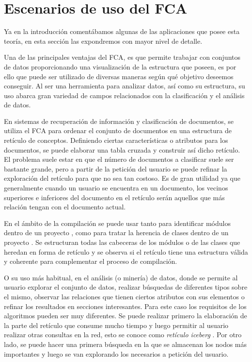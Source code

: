 \documentclass[oneside,openright,titlepage,numbers=noenddot,openany,headinclude,footinclude=true,
cleardoublepage=empty,abstractoff,BCOR=5mm,paper=a4,fontsize=12pt,main=spanish]{scrreprt}
\begin{document}
\section{Escenarios de uso del FCA}
 
Ya en la introducción comentábamos algunas de las aplicaciones que posee esta teoría, en esta sección las expondremos con mayor nivel de detalle. 

Una de las principales ventajas del FCA, es que permite trabajar con conjuntos de datos proporcionando una visualización de la estructura que poseen, es por ello que puede ser utilizado de diversas maneras según qué objetivo deseemos conseguir. Al ser una herramienta para analizar datos, así como su estructura, su uso abarca gran variedad de campos relacionados con la clasificación y el análisis de datos. 

En sistemas de recuperación de información y clasificación de documentos\cite{carpineto_lattice_1996}, \cite{lindig_concept-based_nodate} se utiliza el FCA para ordenar el conjunto de documentos en una estructura de retículo de conceptos. Definiendo ciertas características o atributos para los documentos, se puede elaborar una tabla cruzada y construir así dicho retículo. El problema suele estar en que el número de documentos a clasificar suele ser bastante grande, pero a partir de la petición del usuario se puede refinar la exploración del retículo para que no sea tan costoso. Es de gran utilidad ya que generalmente cuando un usuario se encuentra en un documento, los vecinos superiores e inferiores del documento en el retículo serán aquellos que más relación tengan con el documento actual.

En el ámbito de la compilación se puede usar tanto para identificar módulos dentro de un proyecto \cite{modules_fca}, como para tratar la herencia de clases dentro de un proyecto \cite{classhierarchies_fca}. Se estructuran todas las cabeceras de los módulos o de las clases que heredan en forma de retículo y se observa si el retículo tiene una estructura válida y coherente para complementar el proceso de compilación.

O su uso más habitual, en el análisis (o minería) de datos, donde se permite al usuario explorar el conjunto de datos, realizar búsquedas de diferentes tipos sobre el mismo, observar las relaciones que tienen ciertos atributos con sus elementos o refinar los resultados en secciones interesantes. Para este caso los requisitos de los algoritmos pueden ser muy diferentes. Se puede realizar primero la elaboración de la parte del retículo que consume mucho tiempo y luego permitir al usuario realizar otras consultas en la red, esto se conoce como \textit{retículo iceberg} \cite{iceberg}. Por otro lado, se puede hacer una primera búsqueda en la que se almacenan los nodos más importantes y luego se van explorando los necesarios a petición del usuario. 
\end{document}
